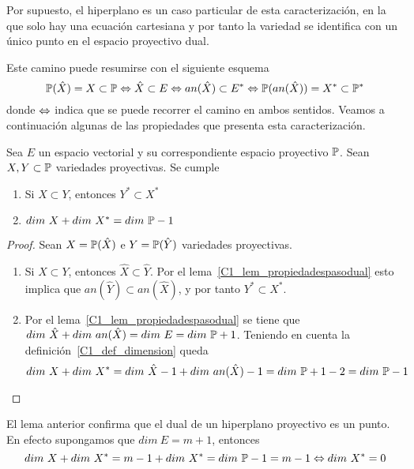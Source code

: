 Por supuesto, el hiperplano es un caso particular de esta caracterización, en la que solo hay una ecuación cartesiana y por tanto la variedad se identifica con un único punto en el espacio proyectivo dual.

Este camino puede resumirse con el siguiente esquema
\begin{equation}
	\mathbb{P}(\hat{X})=X\subset\mathbb{P}\Leftrightarrow \hat{X}\subset E\Leftrightarrow an(\hat{X})\subset E^*\Leftrightarrow \mathbb{P}(an(\hat{X}))=X^*\subset \mathbb{P}^*
\end{equation}
donde $\Leftrightarrow$ indica que se puede recorrer el camino en ambos sentidos.
Veamos a continuación algunas de las propiedades que presenta esta caracterización.
\begin{lem}
	\label{C1_lem_propiedadesPasoProyectivoDual}
	Sea $E$ un espacio vectorial y su correspondiente espacio proyectivo $\mathbb{P}$. Sean $X,Y\subset\mathbb{P}$ variedades proyectivas. Se cumple
	\begin{enumerate}
		\item Si $X\subset Y$, entonces $Y^*\subset X^*$
		\item $dim \ X+dim \ X^*=dim \ \mb{P}-1$
	\end{enumerate}
\end{lem}
\begin{proof}
	Sean $X=\mathbb{P}(\hat{X})$ e $Y=\mathbb{P}(\hat{Y})$ variedades proyectivas.
	\begin{enumerate}
		\item Si $X\subset Y$, entonces $\hat{X}\subset\hat{Y}$. Por el lema~\ref{C1_lem_propiedadespasodual} esto implica que $an(\hat{Y})\subset an(\hat{X})$, y por tanto $Y^*\subset X^*$.
		
		\item Por el lema~\ref{C1_lem_propiedadespasodual} se tiene que $dim \ \hat{X}+dim \ an(\hat{X})=dim \ E=dim \ \mb{P}+1$. Teniendo en cuenta la definición~\ref{C1_def_dimension} queda
		\begin{equation*}
			dim \ X+dim \ X^*=dim \ \hat{X}-1+dim \ an(\hat{X})-1=dim \ \mb{P}+1-2=dim \ \mb{P}-1
		\end{equation*}
	\end{enumerate}
\end{proof}
\begin{obs}
	El lema anterior confirma que el dual de un hiperplano proyectivo es un punto. En efecto supongamos que $dim \ E=m+1$, entonces
	\begin{equation*}
		dim \ X+dim \ X^*=m-1+dim \ X^*=dim \ \mb{P}-1=m-1\sii dim \ X^*=0
	\end{equation*}
\end{obs}
